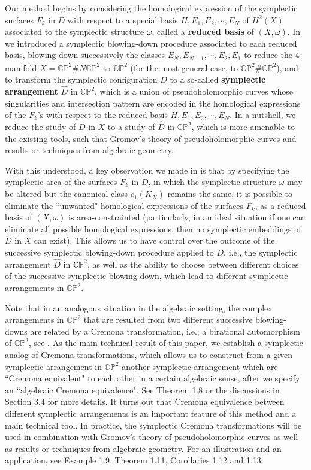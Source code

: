 \documentclass[11pt]{amsart}
\theoremstyle{plain}
\numberwithin{theorem}{section}
\theoremstyle{definition}
\newcommand{\C}{{\mathbb C}}
\renewcommand{\P}{{\mathbb P}}
\begin{document}
\vspace{2mm}

Our method begins by considering the homological expression of the symplectic surfaces $F_k$ in $D$ with respect to a special basis $H,E_1,E_2,\cdots,E_N$ of $H^2(X)$ associated to the symplectic structure $\omega$, called a {\bf reduced basis} of $(X,\omega)$. In \cite{C1} we introduced a symplectic blowing-down procedure associated to each reduced basis, blowing down successively the classes $E_N,E_{N-1},\cdots, E_2, E_1$ to reduce the $4$-manifold $X=\C\P^2\# N\overline{\C\P^2}$ to $\C\P^2$ (for the most general case, to 
$\C\P^2\#\overline{\C\P^2}$), and to transform the symplectic configuration $D$ to a so-called {\bf symplectic arrangement} $\hat{D}$ in $\C\P^2$, which is a union of pseudoholomorphic curves whose singularities and intersection pattern are encoded in the homological expressions of the $F_k$'s with respect to the reduced basis $H,E_1,E_2,\cdots,E_N$. In a nutshell, we reduce the study of $D$ in $X$ to a study of $\hat{D}$ in $\C\P^2$,
which is more amenable to the existing tools, such that Gromov's theory of pseudoholomorphic curves and results or techniques from algebraic geometry. 

With this understood, a key observation we made in \cite{C} is that by specifying the symplectic area of the 
surfaces $F_k$ in $D$, in which the symplectic structure $\omega$ may be altered but the canonical class 
$c_1(K_X)$ remains the same, it is possible to eliminate the ``unwanted" homological expressions of the surfaces $F_k$, as a reduced basis of $(X,\omega)$ is area-constrainted (particularly, in an ideal situation if one can eliminate all possible homological expressions, then no symplectic embeddings of $D$ in $X$ can exist). This allows us to have control over the outcome of the successive symplectic blowing-down procedure applied to $D$, i.e., the symplectic arrangement $\hat{D}$ in $\C\P^2$, as well as the ability to choose between different choices of the successive symplectic blowing-down, which lead to different symplectic arrangements in $\C\P^2$. 

Note that in an analogous situation in the algebraic setting, the complex arrangements in $\C\P^2$ that are resulted from two different successive blowing-downs are related by a Cremona transformation, i.e., a birational automorphism of $\C\P^2$, see \cite{AC}. As the main technical result of this paper, we establish a symplectic analog of Cremona transformations, which allows us to construct from a given symplectic arrangement in $\C\P^2$ another symplectic arrangement which are ``Cremona equivalent" to each other in a certain algebraic sense, after we specify an ``algebraic Cremona equivalence". See Theorem 1.8 or the discussions in Section 3.4 for more details. It turns out that Cremona equivalence between different symplectic arrangements is an important feature of this method and a main technical tool.  In practice, the symplectic Cremona transformations will be used in combination with Gromov's theory of pseudoholomorphic curves as well as results or techniques from algebraic geometry. For an illustration and an application, see  Example 1.9, Theorem 1.11, Corollaries 1.12 and 1.13.
\end{document}
